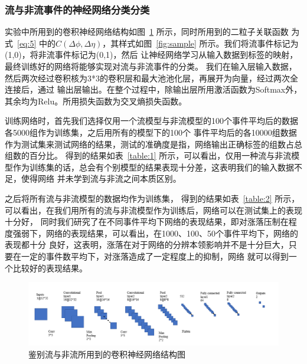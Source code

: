 \documentclass[aps,pre,12pt,preprint,onecolumn,showpacs,showkeys]{revtex4-1}
\begin{document}
\subsubsection{流与非流事件的神经网络分类分类}
实验中所用到的卷积神经网络结构如图~\ref{fig:sjwl} 所示，同时所用到的二粒子关联函数
为式~\ref{eq:5} 中的$C(\Delta\phi,\Delta\eta)$，其样式如图~\ref{fig:sample} 所示。我们将流事件标记为(1,0)，将非流事件标记为(0,1)，然后
让神经网络学习从输入数据到标签的映射，最终训练好的网络将能够实现对流与非流事件的分类。
我们在输入层输入数据，然后两次经过卷积核为3*3的卷积层和最大池池化层，再展开为向量，经过两次全连接后，通过
输出层输出。在整个过程中，除输出层所用激活函数为Softmax外，其余均为Relu。所用损失函数为交叉熵损失函数。\par
训练网络时，首先我们选择仅用一个流模型与非流模型的100个事件平均后的数据各5000组作为训练集，之后用所有的模型下的100个
事件平均后的各10000组数据作为测试集来测试网络的结果，测试的准确度是指，网络输出正确标签的组数占总组数的百分比。
得到的结果如表~\ref{table:1} 所示，可以看出，仅用一种流与非流模型作为训练集的话，总会有个别模型的结果表现十分差，这表明我们的输入数据不足，使得网络
并未学到流与非流之间本质区别。\par
之后将所有流与非流模型的数据均作为训练集，
得到的结果如表~\ref{table:2} 所示，可以看出，在我们用所有的流与非流模型作为训练后，网络可以在测试集上的表现十分好，
同时我们研究了在不同事件平均下网络的表现结果，即对涨落压制在程度强弱下，网络的表现结果，可以看出，在1000、100、50个事件平均下，网络的表现都十分
良好，这表明，涨落在对于网络的分辨本领影响并不是十分巨大，只要在一定的事件数平均下，对涨落造成了一定程度上的抑制，网络
就可以得到一个比较好的表现结果。
\begin{figure}[t]
\centering
\includegraphics[width=140mm]{sjwl}
\caption{\label{fig:sjwl}%
鉴别流与非流所用到的卷积神经网络结构图}
\end{figure}
\end{document}

